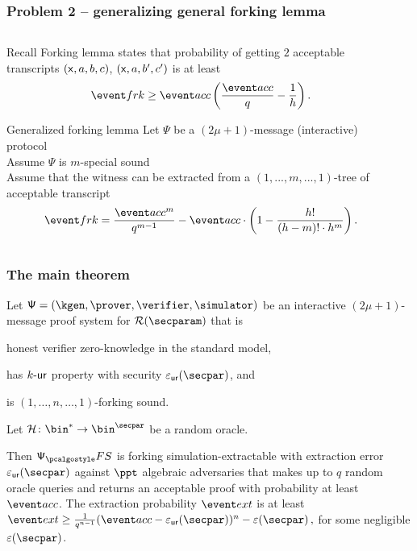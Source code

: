 \documentclass[aspectratio=169,handout]{beamer}
\renewcommand{\myskip}{0.5\baselineskip}
\begin{document}
\begin{frame}
  \frametitle{Problem 2 -- generalizing general forking lemma}
      \begin{columns}[t]
      \begin{column}{.5\linewidth}
        \begin{block}{Recall}
          Forking lemma states that probability of getting $2$ acceptable
          transcripts $(\mathsf{x}, a, b, c)$, $(\mathsf{x}, a, b', c')$ is at least
    \[
      \frkProb \geq \accProb \left(\frac{\accProb}{q} - \frac{1}{h}\right).
    \]
  \end{block}
  \begin{block}{Generalized forking lemma}
    Let $\Psi$ be a $(2\mu + 1)$-message (interactive) protocol\\
    Assume $\Psi$ is $m$-special sound\\
    Assume that the witness can be extracted from a $(1, ..., m, ..., 1)$-tree
    of acceptable transcript\\[\myskip]

    \[
      \frkProb = \frac{\accProb^m}{q^{m - 1}} - \accProb \cdot \left(1 -
        \frac{h!}{(h - m)! \cdot h^{m}}\right).
    \]
  \end{block}
\end{column}
\begin{column}{.5\linewidth}
\end{column}
\end{columns}
\end{frame}

\newcommand{\zkproofs}{\zkproof_\simulator}
\newcommand{\inpa}{\inp_{\adv}}
\newcommand{\zkproofa}{\zkproof_\adv}
\newcommand{\exta}{\ext_\adv}

\begin{frame}
  \frametitle{The main theorem}
\begin{theorem}
  \label{thm:se}
  Let $\ps = (\kgen, \prover, \verifier, \simulator)$ be an interactive
  $(2 \mu + 1)$-message proof system for $\RELGEN(\secparam)$ that is
  \begin{compactitem}
  \item honest verifier zero-knowledge in the standard model, 
  \item has ${k\text{-}\mathsf{ur}}$ property with security $\epsur(\secpar)$, and 
  \item is $(1, \ldots, n, \ldots, 1)$-forking sound.
  \end{compactitem}
%
  Let $\ro\colon \bin^{*} \to \bin^{\secpar}$ be a random oracle.

  Then $\psfs$ is forking simulation-extractable with extraction error
  $\epsur(\secpar)$ against $\ppt$ algebraic adversaries that makes up to $q$
  random oracle queries and returns an acceptable proof with probability at
  least $\accProb$.  The extraction probability $\extProb$ is at least
  \( \extProb \geq \frac{1}{q^{n - 1}} (\accProb - \epsur(\secpar))^{n}
  -\eps(\secpar)\,, \) for some negligible $\eps(\secpar)$.
\end{theorem}
\end{frame}
\end{document}
